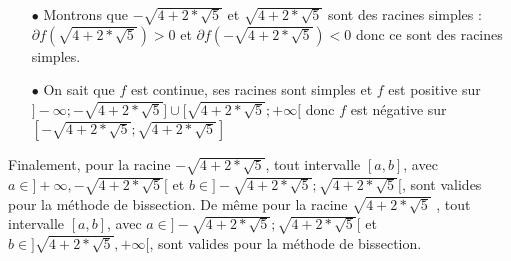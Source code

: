 \documentclass[a4paper, 12pt]{article}
\begin{document}
\begin{itemize}
\begin{itemize}
	\item[$\bullet$] Montrons que $-\sqrt{4 + 2 * \sqrt{5}}$ et $\sqrt{4 + 2 * \sqrt{5}}$ sont des racines simples :\\
	$\partial f(\sqrt{4 + 2 * \sqrt{5}}) > 0 $ et $\partial f(-\sqrt{4 + 2 * \sqrt{5}}) < 0$ donc ce sont des racines simples.
	\item[$\bullet$] On sait que $f$ est continue, ses racines sont simples et $f$ est positive sur \( ] -\infty ; -\sqrt{4 + 2 * \sqrt{5}} ] \cup [ \sqrt{4 + 2 * \sqrt{5}} ; +\infty [ \) donc $f$ est négative sur $ [ -\sqrt{4 + 2 * \sqrt{5}} ; \sqrt{4 + 2 * \sqrt{5}} ] $
\end{itemize}

\end{itemize}
Finalement, pour la racine $-\sqrt{4 + 2 * \sqrt{5}}$, tout intervalle $[a,b]$, avec $a\in ]+\infty,-\sqrt{4 + 2 * \sqrt{5}}[$ et $ b\in ] -\sqrt{4 + 2 * \sqrt{5}} ; \sqrt{4 + 2 * \sqrt{5}} [$, sont valides pour la méthode de bissection. De même pour la racine $\sqrt{4 + 2 * \sqrt{5}}$ , tout intervalle $[a,b]$, avec $a\in ] -\sqrt{4 + 2 * \sqrt{5}} ; \sqrt{4 + 2 * \sqrt{5}} [$ et $b\in ]\sqrt{4 + 2 * \sqrt{5}},+\infty[$, sont valides pour la méthode de bissection.
\newpage
\end{document}
